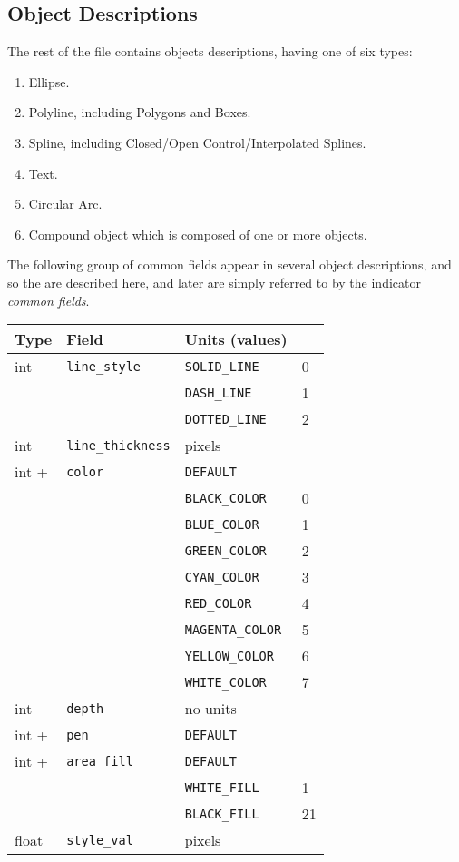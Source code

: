 \subsection{Object Descriptions}
The rest of the file contains objects descriptions,
	having one of six types:

\begin{enumerate}
\item Ellipse.
\item Polyline, including Polygons and Boxes.
\item Spline, including Closed/Open Control/Interpolated Splines.
\item Text.
\item Circular Arc.
\item Compound object which is composed of one or more objects.
\end{enumerate}

The following group of common fields appear in several object
	descriptions, and so the are described here, and later are
	simply referred to by the indicator {\it common fields}.
%
\vspace{2pt}
\begin{center}
\begin{tabular} {|l|l|ll|}
\hline
Type	& Field			& Units (values)	&	\\ \hline
\hline
int	& {\tt line\_style}	& {\tt SOLID\_LINE}	& 0	\\
	&			& {\tt DASH\_LINE}	& 1	\\
	&			& {\tt DOTTED\_LINE}	& 2	\\ \hline
%
int	& {\tt line\_thickness}	& pixels		&	\\ \hline
%
int +	& {\tt color}		& {\tt DEFAULT}		& 	\\
 	&		        & {\tt BLACK\_COLOR}	& 0	\\
 	&              		& {\tt BLUE\_COLOR}	& 1	\\
 	&              		& {\tt GREEN\_COLOR}	& 2	\\ 
 	&              		& {\tt CYAN\_COLOR}	& 3	\\ 
 	&              		& {\tt RED\_COLOR}	& 4	\\ 
 	&              		& {\tt MAGENTA\_COLOR}	& 5	\\ 
 	&              		& {\tt YELLOW\_COLOR}	& 6	\\ 
 	&              		& {\tt WHITE\_COLOR}	& 7	\\ \hline
%
int  	& {\tt depth}		& no units		&	\\ \hline
%
int +	& {\tt pen}		& {\tt DEFAULT}		&	\\ \hline
%
int +	& {\tt area\_fill}	& {\tt DEFAULT}		& 	\\
	&			& {\tt WHITE\_FILL}	&   1	\\
	&			& {\tt BLACK\_FILL}	&   21	\\ \hline
%
float	& {\tt style\_val}	& pixels		&	\\ \hline
\end{tabular}
\end{center}
\vspace{4pt}

